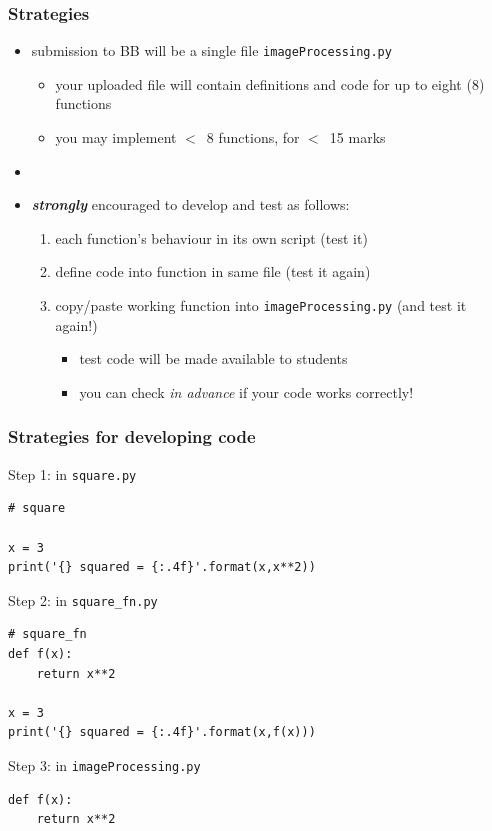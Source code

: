\documentclass[english,14pt]{beamer}
\begin{document}

\begin{frame}[fragile]

\frametitle{Strategies}

\begin{itemize}
	\item submission to BB will be a single file \texttt{imageProcessing.py}
	\begin{itemize}
		\item your uploaded file will contain definitions and code for up to eight (8) functions
		\item you may implement $<$~8 functions, for $<$~15 marks
	\end{itemize}
	\item[]
	
	\item \textbf{\emph{strongly}} encouraged to develop and test as follows:
	\begin{enumerate}
		\item each function's behaviour in its own script (test it)
		\item define code into function in same file (test it again)
		\item copy/paste working function into \texttt{imageProcessing.py} (and test it again!)
		\begin{itemize}
			\item test code will be made available to students
			\item you can check \emph{in advance} if your code works correctly!
	\end{itemize}
	\end{enumerate}
\end{itemize}

\end{frame}


\begin{frame}[fragile]

\frametitle{Strategies for developing code}

Step 1: in \texttt{square.py}
\begin{lstlisting}[style=CStyle,basicstyle=\scriptsize]
# square

x = 3
print('{} squared = {:.4f}'.format(x,x**2))
\end{lstlisting}

\pause

Step 2: in \texttt{square\_fn.py}
\begin{lstlisting}[style=CStyle,basicstyle=\scriptsize]
# square_fn
def f(x):
    return x**2

x = 3
print('{} squared = {:.4f}'.format(x,f(x)))
\end{lstlisting}

\pause

Step 3: in \texttt{imageProcessing.py}
\begin{lstlisting}[style=CStyle,basicstyle=\scriptsize]
def f(x):
    return x**2
\end{lstlisting}

\end{frame}
\end{document}
